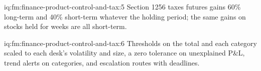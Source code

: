 \begin{solution}{iq:fm:finance-product-control-and-tax:5}
Section 1256 taxes futures gains 60\% long-term and 40\% short-term whatever the holding period; the same gains on stocks held for weeks are all
short-term.
\end{solution}

\begin{solution}{iq:fm:finance-product-control-and-tax:6}
Thresholds on the total and each category scaled to each desk's volatility and size, a zero tolerance on unexplained P\&L, trend alerts on
categories, and escalation routes with deadlines.
\end{solution}
